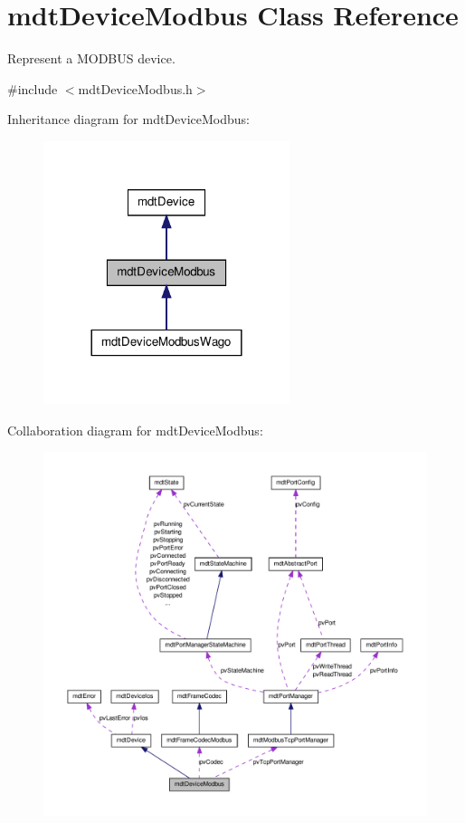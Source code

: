 \hypertarget{classmdt_device_modbus}{
\section{mdtDeviceModbus Class Reference}
\label{classmdt_device_modbus}
}


Represent a MODBUS device.  




{\ttfamily \#include $<$mdtDeviceModbus.h$>$}



Inheritance diagram for mdtDeviceModbus:\nopagebreak
\begin{figure}[H]
\begin{center}
\leavevmode
\includegraphics[width=204pt]{classmdt_device_modbus__inherit__graph}
\end{center}
\end{figure}


Collaboration diagram for mdtDeviceModbus:
\nopagebreak
\begin{figure}[H]
\begin{center}
\leavevmode
\includegraphics[width=400pt]{classmdt_device_modbus__coll__graph}
\end{center}
\end{figure}
